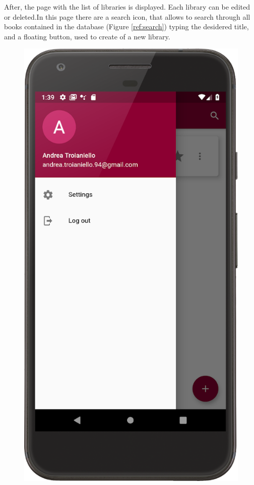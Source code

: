 After, the page with the list of libraries is displayed. Each library can be edited or deleted.In this page there are a search icon, 
that allows to search through all books contained in the database (Figure \ref{ref:search}) typing the desidered title, 
and a floating button, used to create of a new library.

\clearpage
\begin{figure}[!htb]
    \begin{minipage}[b]{0.3\textwidth}
        \centering
        \includegraphics[scale=1]{images/menu.png}

\end{minipage}
\end{figure}
